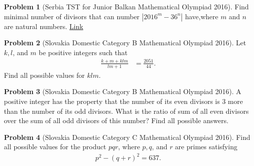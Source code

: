 \documentclass[]{article}
\theoremstyle{definition}
\newtheorem{problem}{Problem}
\begin{document}
\begin{problem}[Serbia TST for Junior Balkan Mathematical Olympiad 2016]
	Find minimal number of divisors that can number $|2016^m-36^n|$ have,where $m$ and $n$ are natural numbers. \hfill \href{http://artofproblemsolving.com/community/c6h1245773p6388606}{Link}
\end{problem}

%
%
%
%
%

\begin{problem}[Slovakia Domestic Category B Mathematical Olympiad 2016]
	Let $k, l$, and $m$ be positive integers such that
		\begin{align*}
			\frac{k+m+klm}{lm+1} &= \frac{2051}{44}.
		\end{align*}
	Find all possible values for $klm$.
\end{problem}


\begin{problem}[Slovakia Domestic Category B Mathematical Olympiad 2016]
	A positive integer has the property that the number of its even divisors is $3$ more than the number of its odd divisors. What is the ratio of sum of all even divisors over the sum of all odd divisors of this number? Find all possible answers.
\end{problem}



\begin{problem}[Slovakia Domestic Category C Mathematical Olympiad 2016]
	Find all possible values for the product $pqr$, where $p, q$, and $r$ are primes satisfying
		\begin{align*}
			p^2 - (q+r)^2 = 637.
		\end{align*}
\end{problem}
\end{document}
